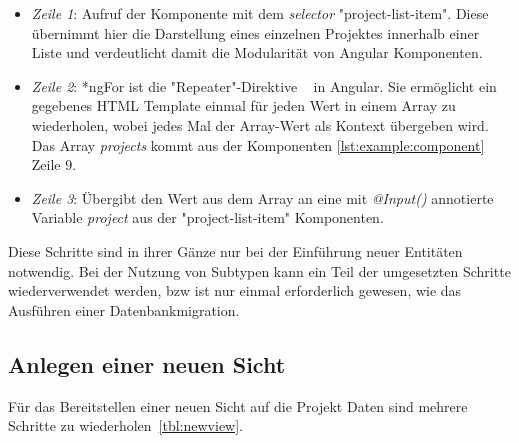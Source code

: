 \begin{itemize}
    \setlength\itemsep{-1em}
    \item \emph{Zeile 1}: Aufruf der Komponente mit dem \emph{selector} "project-list-item".
    Diese übernimmt hier die Darstellung eines einzelnen Projektes innerhalb einer Liste und verdeutlicht damit
    die Modularität von Angular Komponenten.
    \item \emph{Zeile 2}: *ngFor ist die "Repeater"-Direktive ~\cite{ng-for} in Angular.
    Sie ermöglicht ein gegebenes HTML Template einmal für jeden Wert in einem Array zu wiederholen,
    wobei jedes Mal der Array-Wert als Kontext übergeben wird. Das Array \emph{projects} kommt aus der Komponenten \ref{lst:example:component} Zeile 9.
    \item \emph{Zeile 3}: Übergibt den Wert aus dem Array an eine mit \emph{@Input()} annotierte Variable \emph{project} aus der "project-list-item" Komponenten.
\end{itemize}

Diese Schritte sind in ihrer Gänze nur bei der Einführung neuer Entitäten notwendig.
Bei der Nutzung von Subtypen kann ein Teil der umgesetzten Schritte wiederverwendet werden,
bzw ist nur einmal erforderlich gewesen, wie das Ausführen einer Datenbankmigration.

\subsection{Anlegen einer neuen Sicht}
\label{sec:requirements:example:newview}

Für das Bereitstellen einer neuen Sicht auf die Projekt Daten sind mehrere Schritte zu wiederholen~\ref{tbl:newview}.

